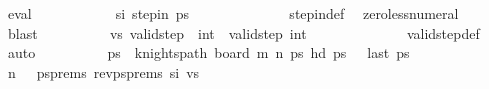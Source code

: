 \begin{isabellebody}
\ eval{\isacharplus}{\kern0pt}\isanewline
\ \ \ \ \ \ \ \ \isamarkupfalse%
\ \isamarkupfalse%
\ si{\isacharcolon}{\kern0pt}\ {\isachardoublequoteopen}step{\isacharunderscore}{\kern0pt}in\ {\isacharquery}{\kern0pt}ps\ {\isacharparenleft}{\kern0pt}{}{\isacharcomma}{\kern0pt}{}{\isacharparenright}{\kern0pt}\ {\isacharparenleft}{\kern0pt}{}{\isacharcomma}{\kern0pt}{}{\isacharparenright}{\kern0pt}{\isachardoublequoteclose}\isanewline
\ \ \ \ \ \ \ \ \ \ \isamarkupfalse%
\ step{\isacharunderscore}{\kern0pt}in{\isacharunderscore}{\kern0pt}def\ \isamarkupfalse%
\ zero{\isacharunderscore}{\kern0pt}less{\isacharunderscore}{\kern0pt}numeral\ \isamarkupfalse%
\ blast\isanewline
\isanewline
\ \ \ \ \ \ \ \ \isamarkupfalse%
\ vs{\isacharcolon}{\kern0pt}\ {\isachardoublequoteopen}valid{\isacharunderscore}{\kern0pt}step\ {\isacharparenleft}{\kern0pt}{}{\isacharcomma}{\kern0pt}{}{\isacharparenright}{\kern0pt}\ {\isacharparenleft}{\kern0pt}{}{\isacharcomma}{\kern0pt}int\ {}{\isacharplus}{\kern0pt}{}{\isacharparenright}{\kern0pt}{\isachardoublequoteclose}\ {\isachardoublequoteopen}valid{\isacharunderscore}{\kern0pt}step\ {\isacharparenleft}{\kern0pt}{}{\isacharcomma}{\kern0pt}int\ {}{\isacharplus}{\kern0pt}{}{\isacharparenright}{\kern0pt}\ {\isacharparenleft}{\kern0pt}{}{\isacharcomma}{\kern0pt}{}{\isacharparenright}{\kern0pt}{\isachardoublequoteclose}\isanewline
\ \ \ \ \ \ \ \ \ \ \isamarkupfalse%
\ valid{\isacharunderscore}{\kern0pt}step{\isacharunderscore}{\kern0pt}def\ \isamarkupfalse%
\ auto\isanewline
\isanewline
\ \ \ \ \ \ \ \ \isamarkupfalse%
\ ps\ \ {\isachardoublequoteopen}knights{\isacharunderscore}{\kern0pt}path\ {\isacharparenleft}{\kern0pt}board\ m\ n{\isacharparenright}{\kern0pt}\ ps{\isachardoublequoteclose}\ {\isachardoublequoteopen}hd\ ps\ {\isacharequal}{\kern0pt}\ {\isacharparenleft}{\kern0pt}{}{\isacharcomma}{\kern0pt}{}{\isacharparenright}{\kern0pt}{\isachardoublequoteclose}\ {\isachardoublequoteopen}last\ ps\ {\isacharequal}{\kern0pt}\ {\isacharparenleft}{\kern0pt}{}{\isacharcomma}{\kern0pt}{}{\isacharparenright}{\kern0pt}{\isachardoublequoteclose}\isanewline
\ \ \ \ \ \ \ \ \ \ \isamarkupfalse%
\ {\isacartoucheopen}n{\isacharminus}{\kern0pt}{}\ {\isasymge}\ {}{\isacartoucheclose}\ psprems\ rev{\isacharunderscore}{\kern0pt}psprems\ si\ vs\isanewline

\end{isabellebody}
